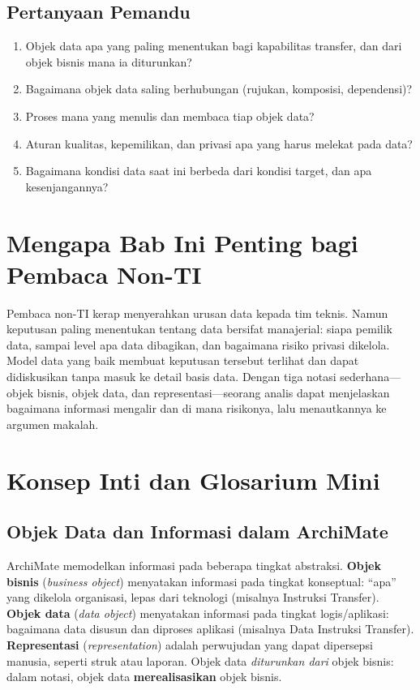 \subsection*{Pertanyaan Pemandu}
\begin{enumerate}
  \item Objek data apa yang paling menentukan bagi kapabilitas transfer, dan dari
        objek bisnis mana ia diturunkan?
  \item Bagaimana objek data saling berhubungan (rujukan, komposisi, dependensi)?
  \item Proses mana yang menulis dan membaca tiap objek data?
  \item Aturan kualitas, kepemilikan, dan privasi apa yang harus melekat pada data?
  \item Bagaimana kondisi data saat ini berbeda dari kondisi target, dan apa
        kesenjangannya?
\end{enumerate}

\section{Mengapa Bab Ini Penting bagi Pembaca Non-TI}

Pembaca non-TI kerap menyerahkan urusan data kepada tim teknis. Namun keputusan
paling menentukan tentang data bersifat manajerial: siapa pemilik data, sampai
level apa data dibagikan, dan bagaimana risiko privasi dikelola. Model data yang
baik membuat keputusan tersebut terlihat dan dapat didiskusikan tanpa masuk ke
detail basis data. Dengan tiga notasi sederhana---objek bisnis, objek data, dan
representasi---seorang analis dapat menjelaskan bagaimana informasi mengalir dan
di mana risikonya, lalu menautkannya ke argumen makalah.

\section{Konsep Inti dan Glosarium Mini}

\subsection{Objek Data dan Informasi dalam ArchiMate}

ArchiMate memodelkan informasi pada beberapa tingkat abstraksi. \textbf{Objek
bisnis} (\emph{business object}) menyatakan informasi pada tingkat konseptual:
``apa'' yang dikelola organisasi, lepas dari teknologi (misalnya Instruksi
Transfer). \textbf{Objek data} (\emph{data object}) menyatakan informasi pada
tingkat logis/aplikasi: bagaimana data disusun dan diproses aplikasi (misalnya
Data Instruksi Transfer). \textbf{Representasi} (\emph{representation}) adalah
perwujudan yang dapat dipersepsi manusia, seperti struk atau laporan. Objek data
\emph{diturunkan dari} objek bisnis: dalam notasi, objek data
\textbf{merealisasikan} objek bisnis.

